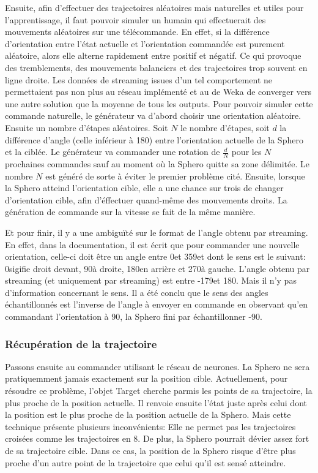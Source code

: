 Ensuite, afin d'effectuer des trajectoires aléatoires mais naturelles et utiles pour l'apprentissage, il faut pouvoir simuler un humain qui effectuerait des mouvements aléatoires sur une télécommande.
En effet, si la différence d'orientation entre l'état actuelle et l'orientation commandée est purement aléatoire, alors elle alterne rapidement entre positif et négatif.
Ce qui provoque des tremblements, des mouvements balanciers et des trajectoires trop souvent en ligne droite.
Les données de streaming issues d'un tel comportement ne permettaient pas non plus au réseau implémenté et au \mlp de Weka de converger vers une autre solution que la moyenne de tous les outputs.
Pour pouvoir simuler cette commande naturelle, le générateur va d'abord choisir une orientation aléatoire.
Ensuite un nombre d'étapes aléatoires.
Soit $N$ le nombre d'étapes, soit $d$ la différence d'angle (celle inférieur à 180\textdegree) entre l'orientation actuelle de la Sphero et la ciblée.
Le générateur va commander une rotation de $\frac{d}{N}$ pour les $N$ prochaines commandes sauf au moment où la Sphero quitte sa zone délimitée.
Le nombre $N$ est généré de sorte à éviter le premier problème cité.
Ensuite, lorsque la Sphero atteind l'orientation cible, elle a une chance sur trois de changer d'orientation cible,
afin d'éffectuer quand-même des mouvements droits.
La génération de commande sur la vitesse se fait de la même manière.

Et pour finir, il y a une ambiguïté sur le format de l'angle obtenu par streaming.
En effet, dans la documentation, il est écrit que pour commander une nouvelle orientation, celle-ci doit être un angle entre 0\textdegree et 359\textdegree et dont le sens est le suivant:
0\textdegree sigifie droit devant, 90\textdegree à droite, 180\textdegree en arrière et 270\textdegree à gauche.\cite{SDKofficiels}
L'angle obtenu par streaming (et uniquement par streaming) est entre -179\textdegree et 180\textdegree.
Mais il n'y pas d'information concernant le sens.
Il a été conclu que le sens des angles échantillonnés est l'inverse de l'angle à envoyer en commande en observant qu'en commandant l'orientation à 90\textdegree, la Sphero fini par échantillonner -90\textdegree.

\subsubsection{Récupération de la trajectoire}
Passons ensuite au commander utilisant le réseau de neurones.
La Sphero ne sera pratiquemment jamais exactement sur la position cible.
Actuellement, pour résoudre ce problème, l'objet Target cherche parmis les points de sa trajectoire, la plus proche de la position actuelle.
Il renvoie ensuite l'état juste après celui dont la position est le plus proche de la position actuelle de la Sphero.
Mais cette technique présente plusieurs inconvénients:
Elle ne permet pas les trajectoires croisées comme les trajectoires en 8.
De plus, la Sphero pourrait dévier assez fort de sa trajectoire cible.
Dans ce cas, la position de la Sphero risque d'être plus proche d'un autre point de la trajectoire que celui qu'il est sensé atteindre.
